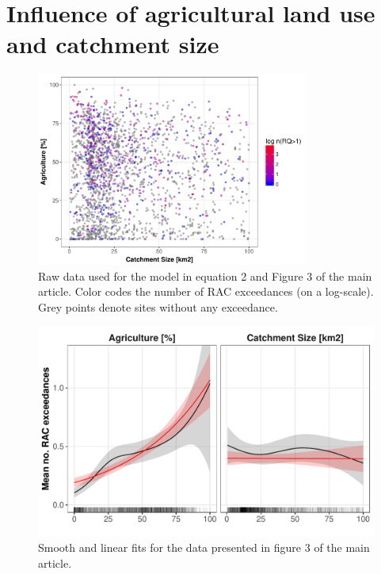 \documentclass[pdftex,
	a4paper,
	titlepage=false]{scrreprt}
\begin{document}
\newpage





\chapter{Influence of agricultural land use and catchment size}

\begin{figure}[ht]
	\centering
	\includegraphics[width = 0.8\textwidth]{ezgagrirac}
	\caption[Raw data used for the model in Eqn. 2 and Fig. 3 of the main article.]{Raw data used for the model in equation 2 and Figure 3 of the main article. Color codes the number of RAC exceedances (on a log-scale). Grey points denote sites without any exceedance.}
	\label{fig:ezgagrirac}
\end{figure}


\begin{figure}[ht]
	\centering
	\includegraphics[width = \textwidth]{smooth_lin.pdf}
	\caption[Smooth and linear fit]{Smooth and linear fits for the data presented in figure 3 of the main article.}
	\label{fig:smooth_lin}
\end{figure}
\end{document}

